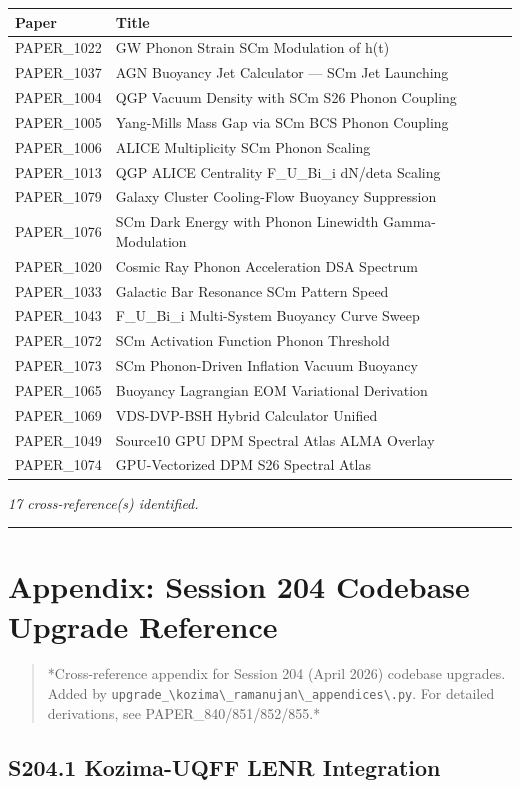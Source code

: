 \documentclass[12pt,a4paper]{article}
\begin{document}
\begin{table}[H]
\centering
\small
\begin{tabularx}{\linewidth}{@{}>{\raggedright\arraybackslash}X>{\raggedright\arraybackslash}X@{}}
\toprule
Paper & Title \tabularnewline
\midrule
PAPER\_1022 & GW Phonon Strain SCm Modulation of h(t) \tabularnewline
PAPER\_1037 & AGN Buoyancy Jet Calculator --- SCm Jet Launching \tabularnewline
PAPER\_1004 & QGP Vacuum Density with SCm S26 Phonon Coupling \tabularnewline
PAPER\_1005 & Yang-Mills Mass Gap via SCm BCS Phonon Coupling \tabularnewline
PAPER\_1006 & ALICE Multiplicity SCm Phonon Scaling \tabularnewline
PAPER\_1013 & QGP ALICE Centrality F\_{U\_Bi\_i} dN/deta Scaling \tabularnewline
PAPER\_1079 & Galaxy Cluster Cooling-Flow Buoyancy Suppression \tabularnewline
PAPER\_1076 & SCm Dark Energy with Phonon Linewidth Gamma-Modulation \tabularnewline
PAPER\_1020 & Cosmic Ray Phonon Acceleration DSA Spectrum \tabularnewline
PAPER\_1033 & Galactic Bar Resonance SCm Pattern Speed \tabularnewline
PAPER\_1043 & F\_{U\_Bi\_i} Multi-System Buoyancy Curve Sweep \tabularnewline
PAPER\_1072 & SCm Activation Function Phonon Threshold \tabularnewline
PAPER\_1073 & SCm Phonon-Driven Inflation Vacuum Buoyancy \tabularnewline
PAPER\_1065 & Buoyancy Lagrangian EOM Variational Derivation \tabularnewline
PAPER\_1069 & VDS-DVP-BSH Hybrid Calculator Unified \tabularnewline
PAPER\_1049 & Source10 GPU DPM Spectral Atlas ALMA Overlay \tabularnewline
PAPER\_1074 & GPU-Vectorized DPM S26 Spectral Atlas \tabularnewline
\bottomrule
\end{tabularx}
\end{table}

\emph{17 cross-reference(s) identified.}

\medskip\hrule\medskip

\section{Appendix: Session 204 Codebase Upgrade Reference}

\begin{quote}
*Cross-reference appendix for Session 204 (April 2026) codebase upgrades.
Added by \texttt{upgrade\_\textbackslash {kozima\textbackslash \_ramanujan\textbackslash \_appendices\textbackslash }.py}. For detailed derivations,
see PAPER\_840/851/852/855.*
\end{quote}

\subsection{S204.1 Kozima-UQFF LENR Integration}
\end{document}
